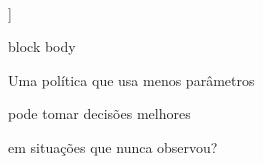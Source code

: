 \documentclass[aspectratio=169,10pt]{beamer}
\begin{document}
\begin{frame}
\begin{center}
{

}

\\]



\vspace{0.35cm}



\begin{beamercolorbox}[

&#x20;   rounded=true,

&#x20;   sep=0.30cm,

&#x20;   wd=0.86\textwidth

]{block body}



\centering



\Large

\color{mainblue}

\bfseries



Uma política que usa menos parâmetros

pode tomar decisões melhores

em situações que nunca observou?



\end{beamercolorbox}



\end{center}



\end{frame}





\end{document}
